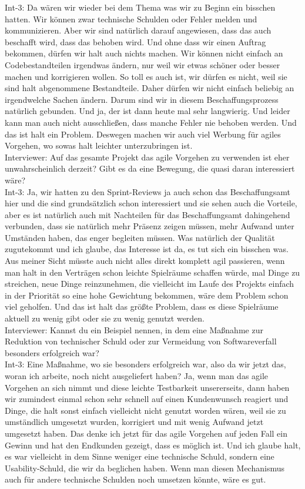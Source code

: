Int-3: Da wären wir wieder bei dem Thema was wir zu Beginn ein bisschen hatten. Wir können zwar technische Schulden oder Fehler melden und kommunizieren. Aber wir sind natürlich darauf angewiesen, dass das auch beschafft wird, dass das behoben wird. Und ohne dass wir einen Auftrag bekommen, dürfen wir halt auch nichts machen. Wir können nicht einfach an Codebestandteilen irgendwas ändern, nur weil wir etwas schöner oder besser machen und korrigieren wollen. So toll es auch ist, wir dürfen es nicht, weil sie sind halt abgenommene Bestandteile. Daher dürfen wir nicht einfach beliebig an irgendwelche Sachen ändern. Darum sind wir in diesem Beschaffungsprozess natürlich gebunden. Und ja, der ist dann heute mal sehr langwierig. Und leider kann man auch nicht ausschließen, dass manche Fehler nie behoben werden. Und das ist halt ein Problem. Deswegen machen wir auch viel Werbung für agiles Vorgehen, wo sowas halt leichter unterzubringen ist.\\
Interviewer: Auf das gesamte Projekt das agile Vorgehen zu verwenden ist eher unwahrscheinlich derzeit? Gibt es da eine Bewegung, die quasi daran interessiert wäre?\\
Int-3: Ja, wir hatten zu den Sprint-Reviews ja auch schon das Beschaffungsamt hier und die sind grundsätzlich schon interessiert und sie sehen auch die Vorteile, aber es ist natürlich auch mit Nachteilen für das Beschaffungsamt dahingehend verbunden, dass sie natürlich mehr Präsenz zeigen müssen, mehr Aufwand unter Umständen haben, das enger begleiten müssen. Was natürlich der Qualität zugutekommt und ich glaube, das Interesse ist da, es tut sich ein bisschen was. Aus meiner Sicht müsste auch nicht alles direkt komplett agil passieren, wenn man halt in den Verträgen schon leichte Spielräume schaffen würde, mal Dinge zu streichen, neue Dinge reinzunehmen, die vielleicht im Laufe des Projekts einfach in der Priorität so eine hohe Gewichtung bekommen, wäre dem Problem schon viel geholfen. Und das ist halt das größte Problem, dass es diese Spielräume aktuell zu wenig gibt oder sie zu wenig genutzt werden.\\
Interviewer: Kannst du ein Beispiel nennen, in dem eine Maßnahme zur Reduktion von technischer Schuld oder zur Vermeidung von Softwareverfall besonders erfolgreich war? \\
Int-3: Eine Maßnahme, wo sie besonders erfolgreich war, also da wir jetzt das, woran ich arbeite, noch nicht ausgeliefert haben? Ja, wenn man das agile Vorgehen an sich nimmt und diese leichte Testbarkeit unsererseits, dann haben wir zumindest einmal schon sehr schnell auf einen Kundenwunsch reagiert und Dinge, die halt sonst einfach vielleicht nicht genutzt worden wären, weil sie zu umständlich umgesetzt wurden, korrigiert und mit wenig Aufwand jetzt umgesetzt haben. Das denke ich jetzt für das agile Vorgehen auf jeden Fall ein Gewinn und hat den Endkunden gezeigt, dass es möglich ist. Und ich glaube halt, es war vielleicht in dem Sinne weniger eine technische Schuld, sondern eine Usability-Schuld, die wir da beglichen haben. Wenn man diesen Mechanismus auch für andere technische Schulden noch umsetzen könnte, wäre es gut. \\
